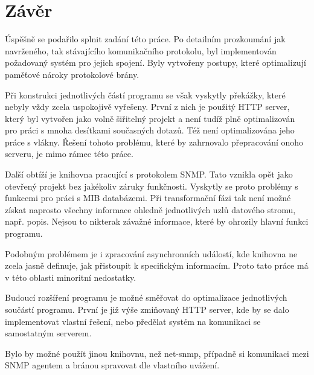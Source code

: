 \chapter{Závěr}
\label{kap_zaver}
Úspěšně se podařilo splnit zadání této práce. Po detailním prozkoumání jak navrženého, tak stávajícího komunikačního protokolu, byl
implementován požadovaný systém pro jejich spojení. Byly vytvořeny postupy, které optimalizují paměťové nároky protokolové brány.

Při konstrukci jednotlivých částí programu se však vyskytly překážky, které nebyly vždy zcela uspokojivě vyřešeny. První z nich je
použitý HTTP server, který byl vytvořen jako volně šiřitelný projekt a není tudíž plně optimalizován pro práci s mnoha desítkami
současných dotazů. Též není optimalizována jeho práce s vlákny. Řešení tohoto problému, které by zahrnovalo přepracování onoho
serveru, je mimo rámec této práce.

Další obtíží je knihovna pracující s protokolem SNMP. Tato vznikla opět jako otevřený projekt bez jakékoliv záruky funkčnosti.
Vyskytly se proto problémy s funkcemi pro práci s MIB databázemi. Při transformační fázi tak není možné získat naprosto všechny 
informace ohledně jednotlivých uzlů datového stromu, např. popis. Nejsou to nikterak závažné informace, které by ohrozily
hlavní funkci programu.

Podobným problémem je i zpracování asynchronních událostí, kde knihovna ne zcela jasně definuje, jak přistoupit k specifickým informacím.
Proto tato práce má v této oblasti minoritní nedostatky.

Budoucí rozšíření programu je možné směřovat do optimalizace jednotlivých součástí programu. První je již výše zmiňovaný HTTP server,
kde by se dalo implementovat vlastní řešení, nebo předělat systém na komunikaci se samostatným serverem.

Bylo by možné použít jinou knihovnu, než net-snmp, případně si komunikaci mezi SNMP agentem a bránou spravovat dle vlastního uvážení.



